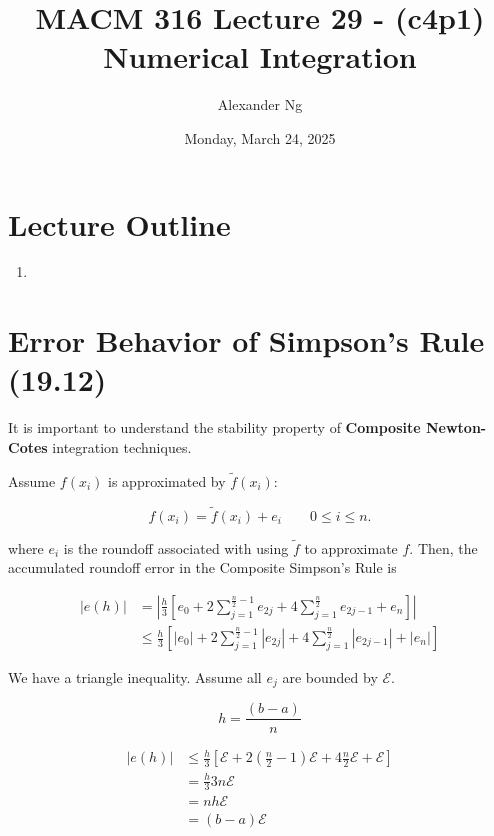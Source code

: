 \documentclass[12pt]{article}
\newcommand{\bigEps}{\mathcal{E}}
\begin{document}
\title{MACM 316 Lecture 29 - (c4p1) Numerical Integration}
\author{Alexander Ng}
\date{Monday, March 24, 2025}

\maketitle

\section*{Lecture Outline}
\begin{enumerate}
\item 
\end{enumerate}

\section{Error Behavior of Simpson's Rule (19.12)}

It is important to understand the stability property of \textbf{Composite
Newton-Cotes} integration techniques.

Assume $f(x_i)$ is approximated by $\tilde{f}(x_i)$:

\begin{equation*}
  f(x_i) = \tilde{f} (x_i) + e_i \qquad 0 \leq i \leq n
.\end{equation*}

\noindent
where $e_i$ is the roundoff associated with using $\tilde{f}$ to approximate
$f$. Then, the accumulated roundoff error in the Composite Simpson's Rule is

\begin{align*}
  |e(h)| &= \left|\frac{h}{3} \left[
    e_0 + 2 \sum_{j=1}^{\frac{n}{2}-1} e_{2j} + 4 \sum_{j=1}^{\frac{n}{2}}
    e_{2j-1} + e_n
  \right]\right| \\
         & \leq \frac{h}{3} \left[
           |e_0| + 2 \sum_{j=1}^{\frac{n}{2}-1} |e_{2j}| + 4 \sum_{j=1}^{\frac{n}{2}}
           |e_{2j-1}| + |e_n|
         \right]
\end{align*}

We have a triangle inequality. Assume all $e_j$ are bounded by $\bigEps$.

\begin{equation*}
  h = \frac{(b-a)}{n}
\end{equation*}


\begin{align*}
  |e(h)| & \leq \frac{h}{3} \left[
    \bigEps + 2(\frac{n}{2} -1)\bigEps + 4 \frac{n}{2} \bigEps + \bigEps
  \right] \\
         &= \frac{h}{3} 3n \bigEps \\
         &= nh \bigEps \\
         &= (b-a) \bigEps \\
\end{align*}
\end{document}
